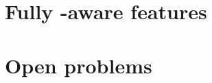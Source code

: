 

\section{Fully \texorpdfstring{}{INP}-aware \texorpdfstring{}{RM} features}


\section{Open problems}
